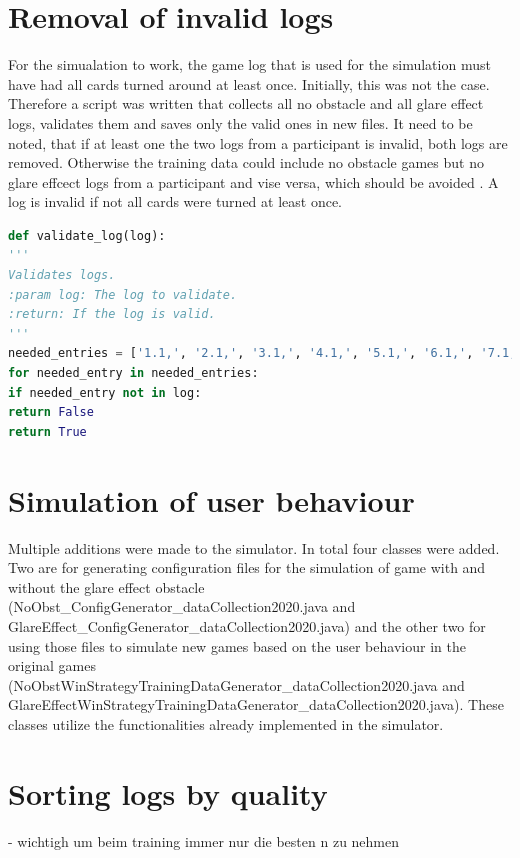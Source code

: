 \section{Removal of invalid logs}
For the simualation to work, the game log that is used for the simulation must have had all cards turned around at least once. Initially, this was not the case. Therefore a script was written that collects all no obstacle and all glare effect logs, validates them and saves only the valid ones in new files. It need to be noted, that if at least one the two logs from a participant is invalid, both logs are removed. Otherwise the training data could include no obstacle games but no glare effcect logs from a participant and vise versa, which should be avoided . A log is invalid if not all cards were turned at least once. 
\begin{lstlisting}[language=python, caption=Add caption]
def validate_log(log):
'''
Validates logs.
:param log: The log to validate. 
:return: If the log is valid.
'''
needed_entries = ['1.1,', '2.1,', '3.1,', '4.1,', '5.1,', '6.1,', '7.1,', '1.2,', '2.2,', '3.2,', '4.2,', '5.2,', '6.2,', '7.2,']
for needed_entry in needed_entries:
if needed_entry not in log:
return False
return True
\end{lstlisting}

\section{Simulation of user behaviour}
Multiple additions were made to the simulator. In total four classes were added. Two are for generating configuration files for the simulation of game with and without the glare effect obstacle (NoObst\_ConfigGenerator\_dataCollection2020.java and GlareEffect\_ConfigGenerator\_dataCollection2020.java) and the other two for using those files to simulate new games based on the user behaviour in the original games (NoObstWinStrategyTrainingDataGenerator\_dataCollection2020.java and GlareEffectWinStrategyTrainingDataGenerator\_dataCollection2020.java). These classes utilize the functionalities already implemented in the simulator. 



\section{Sorting logs by quality}
- wichtigh um beim training immer nur die besten n zu nehmen

